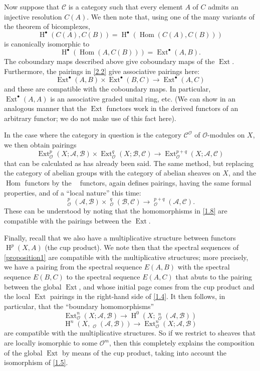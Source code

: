 \documentclass{article}
\theoremstyle{plain}
\theoremstyle{definition}
\newcommand{\sh}[1]{{\mathscr{#1}}}
\newcommand{\cat}[1]{{\mathcal{#1}}}
\DeclareMathOperator{\Ext}{Ext}
\DeclareMathOperator{\Hom}{Hom}
\DeclareMathOperator{\shExt}{\underline{Ext}}
\DeclareMathOperator{\shHom}{\underline{Hom}}
\DeclareMathOperator{\HH}{H}
\newcommand{\oldpage}[1]{\marginpar{\footnotesize$\Big\vert$ \textit{p.~#1}}}
\begin{document}
Now suppose that $\cat{C}$ is a category such that every element $A$ of $C$ admits an injective resolution $C(A)$.
We then note that, using one of the many variants of the theorem of bicomplexes,
\[
  \HH^\bullet(C(A),C(B)) = \HH^\bullet(\Hom(C(A),C(B)))
\]
is canonically isomorphic to
\[
  \HH^\bullet(\Hom(A,C(B))) = \Ext^\bullet(A,B).
\]
The coboundary maps described above give coboundary maps of the $\Ext$.
Furthermore, the pairings in \cref{2.2} give associative pairings here:
\[
\label{2.3}
  \Ext^\bullet(A,B)\times\Ext^\bullet(B,C) \to \Ext^\bullet(A,C)
\tag{2.3}
\]
and these are compatible with the coboundary maps.
In particular, $\Ext^\bullet(A,A)$ is an associative graded unital ring, etc.
(We can show in an analogous manner that the $\Ext$ functors work in the derived functors of an arbitrary functor;
we do not make use of this fact here).

In the case where the category in question is the category $\cat{C}^\sh{O}$ of $\sh{O}$-modules on $X$, we then obtain pairings
\[
\label{2.4}
  \Ext_\sh{O}^p(X;\sh{A},\sh{B})\times\Ext_\sh{O}^q(X;\sh{B},\sh{C}) \to \Ext_\sh{O}^{p+q}(X;\sh{A},\sh{C})
\tag{2.4}
\]
that can be calculated as has already been said.
The same method, but replacing the category of abelian groups with the category of abelian sheaves on $X$, and the $\Hom$ functors by the $\shHom$ functors, again defines pairings, having the same formal properties, and of a ``local nature'' this time:
\[
\label{2.5}
  \shExt_\sh{O}^p(\sh{A},\sh{B})\times\shExt_\sh{O}^q(\sh{B},\sh{C}) \to \shExt_\sh{O}^{p+q}(\sh{A},\sh{C}).
\tag{2.5}
\]
These can be understood by noting that the homomorphisms in \cref{1.8} are compatible with the pairings between the $\Ext$.

\oldpage{149-05}
Finally, recall that we also have a multiplicative structure between functors $\HH^p(X,A)$ (the cup product).
We note then that the spectral sequences of \cref{proposition1} are compatible with the multiplicative structures;
more precisely, we have a pairing from the spectral sequence $E(A,B)$ with the spectral sequence $E(B,C)$ to the spectral sequence $E(A,C)$ that abuts to the pairing between the global $\Ext$, and whose initial page comes from the cup product and the local $\Ext$ pairings in the right-hand side of \cref{1.4}.
It then follows, in particular, that the ``boundary homomorphisms''
\[
\label{2.6}
  \Ext_\sh{O}^n(X;\sh{A},\sh{B}) \to \HH^0(X;\shExt_\sh{O}^n(\sh{A},\sh{B}))
\tag{2.6}
\]
\[
\label{2.7}
  \HH^n(X,\shHom_\sh{O}(\sh{A},\sh{B})) \to \Ext_\sh{O}^n(X;\sh{A},\sh{B})
\tag{2.7}
\]
are compatible with the multiplicative structures.
So if we restrict to sheaves that are locally isomorphic to some $\sh{O}^m$, then this completely explains the composition of the global $\Ext$ by means of the cup product, taking into account the isomorphism of \cref{1.5}.
\end{document}
